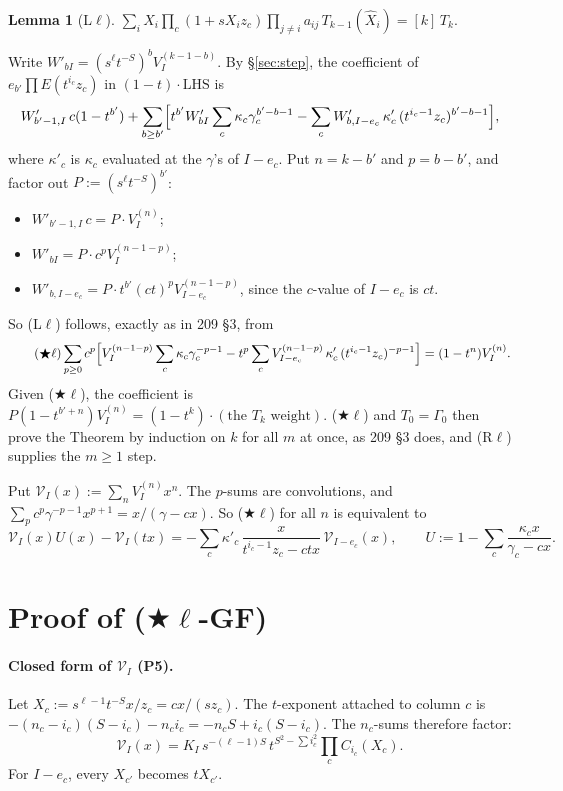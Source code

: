 \documentclass[11pt]{amsart}
\newtheorem{lemma}[theorem]{Lemma}
\theoremstyle{remark}
\newcommand{\hX}{\widehat{X}}
\newcommand{\cV}{\mathcal{V}}
\newcommand{\plab}[1]{\textbf{(#1)}}
\newcommand{\starl}{($\bigstar\ell$)}
\begin{document}
\begin{lemma}[L$\ell$]
$\displaystyle\sum_iX_i\prod_c(1+sX_iz_c)\prod_{j\ne i}a_{ij}\,T_{k-1}(\hX_i)=[k]\,T_k.$
\end{lemma}

Write $W'_{bI}=(s^\ell t^{-S})^bV^{(k-1-b)}_I$. By \S\ref{sec:step}, the coefficient of $e_{b'}\prod E(t^{i_c}z_c)$ in $(1-t)\cdot\mathrm{LHS}$ is
\[
W'_{b'-1,I}\,c(1-t^{b'})+\sum_{b\ge b'}\Bigl[t^{b'}W'_{bI}\sum_c\kappa_c\gamma_c^{b'-b-1}-\sum_cW'_{b,I-e_c}\,\kappa'_c\,(t^{i_c-1}z_c)^{b'-b-1}\Bigr],
\]
where $\kappa'_c$ is $\kappa_c$ evaluated at the $\gamma$'s of $I-e_c$. Put $n=k-b'$ and $p=b-b'$, and factor out $P:=(s^\ell t^{-S})^{b'}$:
\begin{itemize}
\item $W'_{b'-1,I}\,c=P\cdot V^{(n)}_I$;
\item $W'_{bI}=P\cdot c^pV^{(n-1-p)}_I$;
\item $W'_{b,I-e_c}=P\cdot t^{b'}(ct)^pV^{(n-1-p)}_{I-e_c}$, since the $c$-value of $I-e_c$ is $ct$.
\end{itemize}
So (L$\ell$) follows, exactly as in 209 \S3, from
\begin{equation}\tag{$\bigstar\ell$}
\sum_{p\ge0}c^p\Bigl[V^{(n-1-p)}_I\sum_c\kappa_c\gamma_c^{-p-1}-t^p\sum_cV^{(n-1-p)}_{I-e_c}\,\kappa'_c\,(t^{i_c-1}z_c)^{-p-1}\Bigr]=(1-t^n)V^{(n)}_I.
\end{equation}
Given \starl, the coefficient is $P(1-t^{b'+n})V^{(n)}_I=(1-t^k)\cdot(\text{the }T_k\text{ weight})$. \starl{} and $T_0=\Gamma_0$ then prove the Theorem by induction on $k$ for all $m$ at once, as 209 \S3 does, and (R$\ell$) supplies the $m\ge1$ step.

Put $\cV_I(x):=\sum_nV^{(n)}_Ix^n$. The $p$-sums are convolutions, and $\sum_pc^p\gamma^{-p-1}x^{p+1}=x/(\gamma-cx)$. So \starl{} for all $n$ is equivalent to
\begin{equation}\tag{$\bigstar\ell$-GF}
\cV_I(x)U(x)-\cV_I(tx)=-\sum_c\kappa'_c\,\frac{x}{t^{i_c-1}z_c-ctx}\,\cV_{I-e_c}(x),\qquad U:=1-\sum_c\frac{\kappa_cx}{\gamma_c-cx}.
\end{equation}

\section{Proof of (\texorpdfstring{$\bigstar\ell$}{*l}-GF)}\label{sec:proof}

\paragraph{Closed form of $\cV_I$ \plab{P5}.} Let $X_c:=s^{\ell-1}t^{-S}x/z_c=cx/(sz_c)$. The $t$-exponent attached to column $c$ is $-(n_c-i_c)(S-i_c)-n_ci_c=-n_cS+i_c(S-i_c)$. The $n_c$-sums therefore factor:
\[
\cV_I(x)=K_I\,s^{-(\ell-1)S}\,t^{S^2-\sum i_c^2}\prod_cC_{i_c}(X_c).
\]
For $I-e_c$, every $X_{c'}$ becomes $tX_{c'}$.
\end{document}
